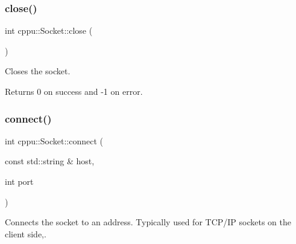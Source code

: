 \subsubsection{\texorpdfstring{close()}{close()}}
{\footnotesize\ttfamily int cppu\+::\+Socket\+::close (\begin{DoxyParamCaption}{ }\end{DoxyParamCaption})\hspace{0.3cm}{\ttfamily [virtual]}}



Closes the socket. 

\begin{DoxyReturn}{Returns}
0 on success and -\/1 on error. 
\end{DoxyReturn}
\mbox{\label{classcppu_1_1_socket_af6db3840caee709738f0e2a9ff814e5d}} 
\subsubsection{\texorpdfstring{connect()}{connect()}}
{\footnotesize\ttfamily int cppu\+::\+Socket\+::connect (\begin{DoxyParamCaption}\item[{const std\+::string \&}]{host,  }\item[{int}]{port }\end{DoxyParamCaption})\hspace{0.3cm}{\ttfamily [virtual]}}



Connects the socket to an address. Typically used for T\+C\+P/\+IP sockets on the client side,. 

